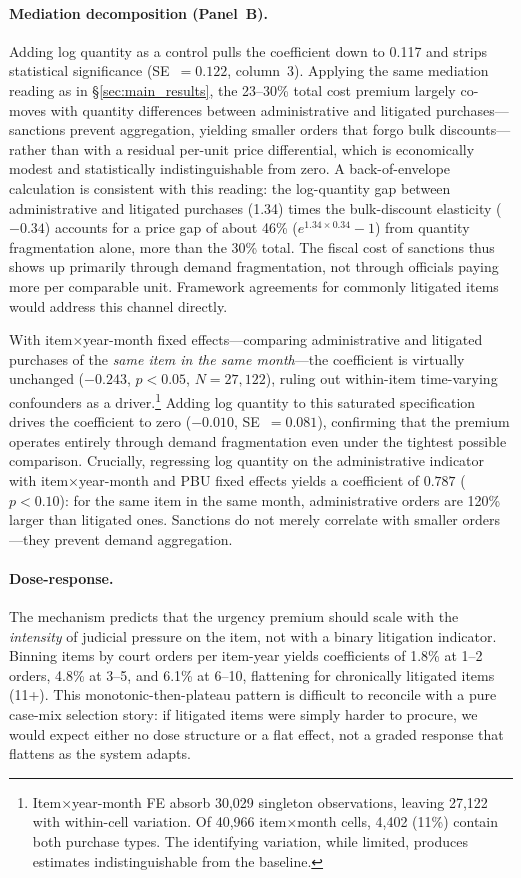\paragraph{Mediation decomposition (Panel~B).}
Adding log quantity as a control pulls the coefficient down to 0.117 and strips statistical significance (SE~$= 0.122$, column~3). Applying the same mediation reading as in \S\ref{sec:main_results}, the 23--30\% total cost premium largely co-moves with quantity differences between administrative and litigated purchases---sanctions prevent aggregation, yielding smaller orders that forgo bulk discounts---rather than with a residual per-unit price differential, which is economically modest and statistically indistinguishable from zero. A back-of-envelope calculation is consistent with this reading: the log-quantity gap between administrative and litigated purchases (1.34) times the bulk-discount elasticity ($-0.34$) accounts for a price gap of about 46\% ($e^{1.34 \times 0.34} - 1$) from quantity fragmentation alone, more than the 30\% total. The fiscal cost of sanctions thus shows up primarily through demand fragmentation, not through officials paying more per comparable unit. Framework agreements for commonly litigated items would address this channel directly.

With item$\times$year-month fixed effects---comparing administrative and litigated purchases of the \emph{same item in the same month}---the coefficient is virtually unchanged ($-0.243$, $p < 0.05$, $N = 27{,}122$), ruling out within-item time-varying confounders as a driver.\footnote{Item$\times$year-month FE absorb 30,029 singleton observations, leaving 27,122 with within-cell variation. Of 40,966 item$\times$month cells, 4,402 (11\%) contain both purchase types. The identifying variation, while limited, produces estimates indistinguishable from the baseline.} Adding log quantity to this saturated specification drives the coefficient to zero ($-0.010$, SE~$= 0.081$), confirming that the premium operates entirely through demand fragmentation even under the tightest possible comparison. Crucially, regressing log quantity on the administrative indicator with item$\times$year-month and PBU fixed effects yields a coefficient of $0.787$ ($p < 0.10$): for the same item in the same month, administrative orders are 120\% larger than litigated ones. Sanctions do not merely correlate with smaller orders---they prevent demand aggregation.

\paragraph{Dose-response.} The mechanism predicts that the urgency premium should scale with the \emph{intensity} of judicial pressure on the item, not with a binary litigation indicator. Binning items by court orders per item-year yields coefficients of 1.8\% at 1--2 orders, 4.8\% at 3--5, and 6.1\% at 6--10, flattening for chronically litigated items (11+). This monotonic-then-plateau pattern is difficult to reconcile with a pure case-mix selection story: if litigated items were simply harder to procure, we would expect either no dose structure or a flat effect, not a graded response that flattens as the system adapts.

